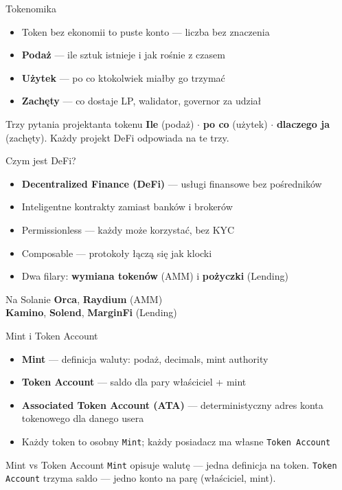 \begin{frame}{Tokenomika}
  \begin{itemize}
    \item Token bez ekonomii to puste konto --- liczba bez znaczenia
    \item \textbf{Podaż} --- ile sztuk istnieje i jak rośnie z czasem
    \item \textbf{Użytek} --- po co ktokolwiek miałby go trzymać
    \item \textbf{Zachęty} --- co dostaje LP, walidator, governor za udział
  \end{itemize}
  \vspace{0.25cm}
  \begin{block}{Trzy pytania projektanta tokenu}
    \textbf{Ile} (podaż) $\cdot$ \textbf{po co} (użytek) $\cdot$
    \textbf{dlaczego ja} (zachęty). Każdy projekt DeFi odpowiada na te trzy.
  \end{block}
\end{frame}

\begin{frame}{Czym jest DeFi?}
  \begin{itemize}
    \item \textbf{Decentralized Finance (DeFi)} --- usługi finansowe bez pośredników
    \item Inteligentne kontrakty zamiast banków i brokerów
    \item Permissionless --- każdy może korzystać, bez KYC
    \item Composable --- protokoły łączą się jak klocki
    \item Dwa filary: \textbf{wymiana tokenów} (AMM) i \textbf{pożyczki} (Lending)
  \end{itemize}
  \vspace{0.3cm}
  \begin{exampleblock}{Na Solanie}
    \textbf{Orca}, \textbf{Raydium} (AMM) \\
    \textbf{Kamino}, \textbf{Solend}, \textbf{MarginFi} (Lending)
  \end{exampleblock}
\end{frame}

\begin{frame}{Mint i Token Account}
  \begin{itemize}
    \item \textbf{Mint} --- definicja waluty: podaż, decimals, mint authority
    \item \textbf{Token Account} --- saldo dla pary właściciel + mint
    \item \textbf{Associated Token Account (ATA)} --- deterministyczny adres konta tokenowego dla danego usera
    \item Każdy token to osobny \texttt{Mint}; każdy posiadacz ma własne \texttt{Token Account}
  \end{itemize}
  \vspace{0.3cm}
  \begin{block}{Mint vs Token Account}
    \texttt{Mint} opisuje walutę --- jedna definicja na token.
    \texttt{Token Account} trzyma saldo --- jedno konto na parę (właściciel, mint).
  \end{block}
\end{frame}

